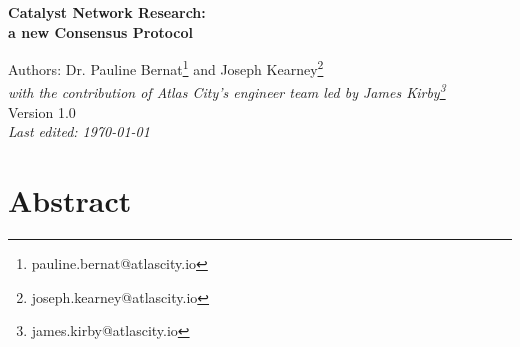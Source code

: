 \documentclass[a4paper, 12pt]{book}
\begin{document}
\begin{titlepage}

\par
\hfill
{}%
\par

\begin{center}
\vspace*{4cm}
\LARGE
\textbf{Catalyst Network Research:\\
a new Consensus Protocol}

\large
\vspace{1.5cm}
\renewcommand{\thefootnote}{\fnsymbol{footnote}}
Authors: Dr. Pauline Bernat\footnote{pauline.bernat@atlascity.io} and Joseph Kearney\footnote{joseph.kearney@atlascity.io}\\
\small
\vspace{.5cm}
\textit{with the contribution of Atlas City's engineer team led by James Kirby\footnote{james.kirby@atlascity.io}}\\
\vspace{1.5cm}
Version 1.0
 \\
\vspace{0.5cm}
\textit{Last edited: \today}
\end{center}
\end{titlepage}
%



\renewcommand{\thefootnote}{\arabic{footnote}}

\chapter*{Abstract}


\tableofcontents
\end{document}
